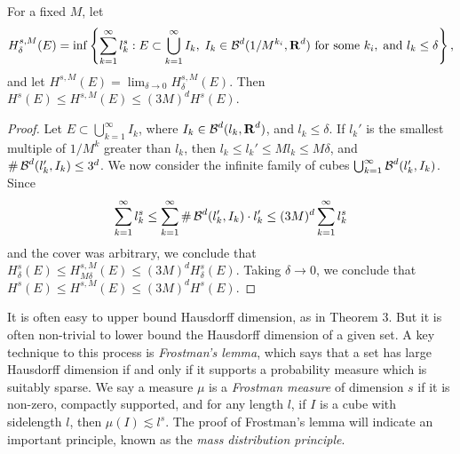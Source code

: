 \begin{lemma}
	For a fixed $M$, let
	\[ H^{s,M}_\delta(E) = \inf \left\{ \sum_{k = 1}^\infty l_k^s : E \subset \bigcup_{k = 1}^\infty I_k,\; I_k \in \operatorname{\mathcal{B}}^d(1/M^{k_i},\operatorname{\mathbf{R}}^d)\ \text{for some $k_i$}, \; \text{and}\ l_k \leq \delta \right\}, \]
	and let $H^{s,M}(E) = \lim_{\delta \to 0} H^{s,M}_\delta(E)$. Then $H^s(E) \leq H^{s,M}(E) \leq (3M)^d H^s(E)$.
\end{lemma}
\begin{proof}
	Let $E \subset \bigcup_{k = 1}^\infty I_k$, where $I_k \in \operatorname{\mathcal{B}}^d(l_k,\operatorname{\mathbf{R}}^d)$, and $l_k \leq \delta$. If $l_k'$ is the smallest multiple of $1/M^k$ greater than $l_k$, then $l_k \leq l_k' \leq M l_k \leq M\delta$, and $\# \operatorname{\mathcal{B}}^d(l_k',I_k) \leq 3^d$. We now consider the infinite family of cubes $\bigcup_{k = 1}^\infty \operatorname{\mathcal{B}}^d(l_k', I_k)$. Since
	\[ \sum_{k = 1}^\infty l_k^s \leq \sum_{k = 1}^\infty \# \operatorname{\mathcal{B}}^d(l_k', I_k) \cdot l_k' \leq (3M)^d \sum_{k = 1}^\infty l_k^s \]
	and the cover was arbitrary, we conclude that $H^s_\delta(E) \leq H^{s,M}_{M\delta}(E) \leq (3M)^d H^s_\delta(E)$. Taking $\delta \to 0$, we conclude that $H^s(E) \leq H^{s,M}(E) \leq (3M)^d H^s(E)$.
\end{proof}

It is often easy to upper bound Hausdorff dimension, as in Theorem 3. But it is often non-trivial to lower bound the Hausdorff dimension of a given set. A key technique to this process is {\it Frostman's lemma}, which says that a set has large Hausdorff dimension if and only if it supports a probability measure which is suitably sparse. We say a measure $\mu$ is a {\it Frostman measure} of dimension $s$ if it is non-zero, compactly supported, and for any length $l$, if $I$ is a cube with sidelength $l$, then $\mu(I) \lesssim l^s$. The proof of Frostman's lemma will indicate an important principle, known as the {\it mass distribution principle}.

